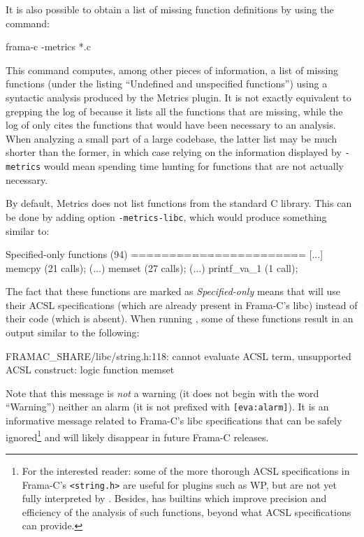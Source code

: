 \documentclass{frama-c-book}
\begin{document}
It is also possible to obtain a list of
missing function definitions by using the command:
\begin{frama-c-commands}
frama-c -metrics *.c
\end{frama-c-commands}
This command computes, among other pieces of information,
a list of missing functions
(under the listing ``Undefined and unspecified functions'')
using a syntactic analysis produced by the \textsf{Metrics} plugin.
It is not exactly equivalent to
grepping the log of \Eva{} because it lists
all the functions that are missing, while the log of
\Eva{} only cites the functions that would have
been necessary to an analysis. When
analyzing a small part of a large codebase, the latter list
may be much shorter than the former, in which case
relying on the information displayed by \lstinline|-metrics| would
mean spending time hunting for functions that are not actually
necessary.

By default, \textsf{Metrics} does not list functions from the standard C
library. This can be done by adding option \verb|-metrics-libc|, which would
produce something similar to:

\begin{logs}
Specified-only functions (94)
=======================
[...]
memcpy (21 calls); (...) memset (27 calls); (...) printf_va_1 (1 call);
\end{logs}

The fact that these functions are marked as {\em Specified-only}
means that \Eva{} will use their ACSL specifications (which are already present
in Frama-C's libc) instead of their code (which is absent). When running \Eva{},
some of these functions result in an output similar to the following:

\begin{logs}
[eva] FRAMAC_SHARE/libc/string.h:118:
  cannot evaluate ACSL term, unsupported ACSL construct: logic function memset
\end{logs}

Note that this message is {\em not} a warning (it does not begin with the word
``Warning'') neither an alarm (it is not prefixed with \verb|[eva:alarm]|). It
is an informative message related to Frama-C's libc specifications that can be
safely ignored\footnote{For the interested reader:
some of the more thorough ACSL specifications in Frama-C's
\texttt{<string.h>} are useful for plugins such as \textsf{WP},
but are not yet fully interpreted by \Eva{}. Besides, \Eva{} has builtins which
improve precision and efficiency of the analysis of such functions, beyond what
ACSL specifications can provide.} and will likely disappear in future Frama-C
releases.
\end{document}

